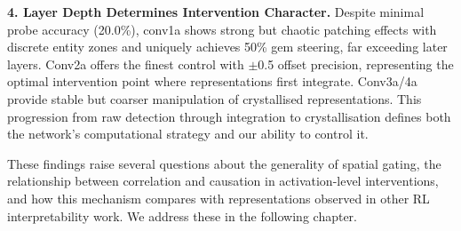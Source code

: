 \textbf{4. Layer Depth Determines Intervention Character.} Despite minimal probe accuracy (20.0\%), conv1a shows strong but chaotic patching effects with discrete entity zones and uniquely achieves 50\% gem steering, far exceeding later layers. Conv2a offers the finest control with $\pm$0.5 offset precision, representing the optimal intervention point where representations first integrate. Conv3a/4a provide stable but coarser manipulation of crystallised representations. This progression from raw detection through integration to crystallisation defines both the network's computational strategy and our ability to control it.

These findings raise several questions about the generality of spatial gating, the relationship between correlation and causation in activation-level interventions, and how this mechanism compares with representations observed in other RL interpretability work. We address these in the following chapter.